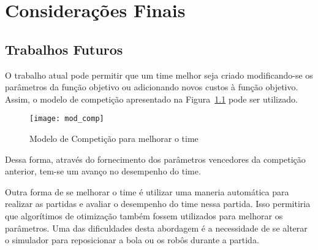 \chapter{Considerações Finais}\label{cap:cons_finais}

\section{Trabalhos Futuros}

O trabalho atual pode permitir que um time melhor seja criado modificando-se os
parâmetros da função objetivo ou adicionando novos custos à função objetivo.
Assim, o modelo de competição apresentado na Figura~\ref{fig:mod_comp} pode ser
utilizado.

\begin{figure}[H]
  \centering
  \texttt{[image: mod\_comp]}
  \caption{Modelo de Competição para melhorar
           o time}\label{fig:mod_comp}
\end{figure}

Dessa forma, através do fornecimento dos parâmetros vencedores da competição
anterior, tem-se um avanço no desempenho do time.

Outra forma de se melhorar o time é utilizar uma maneria automática para
realizar as partidas e avaliar o desempenho do time nessa partida. Isso
permitiria que algorítimos de otimização também fossem utilizados para melhorar
os parâmetros.  Uma das dificuldades desta abordagem é a necessidade de se
alterar o simulador para reposicionar a bola ou os robôs durante a partida.

